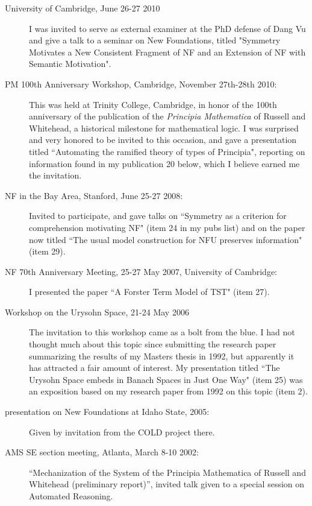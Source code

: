 \begin{description}
\begin{description}
\item[University of Cambridge, June 26-27 2010]  I was invited to serve as external examiner at the  PhD defense of Dang Vu and give a talk to a seminar on New Foundations, titled "Symmetry Motivates a New Consistent Fragment of NF and an Extension of NF with Semantic Motivation".

\item[PM 100th Anniversary Workshop, Cambridge, November 27th-28th 2010:]   This was held at Trinity College, Cambridge, in honor of the 100th anniversary of the publication of the {\em Principia Mathematica\/} of Russell and Whitehead, a historical milestone for mathematical logic. I was surprised and very honored to be invited to this occasion, and gave a
presentation titled  ``Automating the ramified theory of types of Principia", reporting on information found in my publication 20 below, which I believe earned me the invitation.

\item[NF in the Bay Area, Stanford, June 25-27 2008:]  Invited to participate, and gave talks on  ``Symmetry as a criterion for comprehension motivating NF" (item 24 in my pubs list)  and on the paper now titled ``The usual model construction for NFU preserves information" (item 29).

\item[NF 70th Anniversary Meeting, 25-27 May 2007, University of Cambridge:]  I presented the paper ``A Forster Term Model of TST" (item 27).

\item[Workshop on the Urysohn Space, 21-24 May 2006]   The invitation to this workshop came as a bolt from the blue.  I had not thought much about this topic since submitting the research paper summarizing the results of my Masters thesis in 1992, but apparently it has attracted a fair amount of interest.  My presentation titled ``The Urysohn Space embeds in Banach Spaces in Just One Way"
(item 25) was an exposition based on my research paper from 1992 on this topic (item 2).

\item[presentation on New Foundations at Idaho State, 2005:]  Given by invitation from the COLD project there.

\item[AMS SE section meeting, Atlanta, March 8-10 2002:]  ``Mechanization of the System of the Principia Mathematica of Russell and Whitehead (preliminary report)'', invited talk given to a special session on Automated Reasoning.


\end{description}
\end{description}
